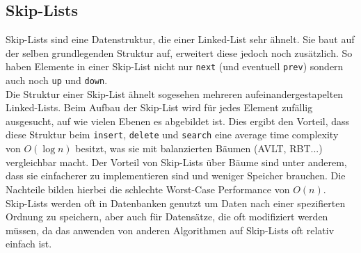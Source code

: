 \documentclass[
../../AuD-Zusammenfassung.tex,
]
{subfiles}
\begin{document}
\subsection{Skip-Lists}
Skip-Lists sind eine Datenstruktur, die einer Linked-List sehr ähnelt. Sie baut auf der selben grundlegenden Struktur auf, erweitert diese jedoch noch zusätzlich. So haben Elemente in einer Skip-List nicht nur \texttt{next} (und eventuell \texttt{prev}) sondern auch noch \texttt{up} und \texttt{down}. \\
Die Struktur einer Skip-List ähnelt sogesehen mehreren aufeinandergestapelten Linked-Lists. Beim Aufbau der Skip-List wird für jedes Element zufällig ausgesucht, auf wie vielen Ebenen es abgebildet ist. Dies ergibt den Vorteil, dass diese Struktur beim \texttt{insert}, \texttt{delete} und \texttt{search} eine average time complexity von $O(\log n)$ besitzt, was sie mit balanzierten Bäumen (AVLT, RBT...) vergleichbar macht. Der Vorteil von Skip-Lists über Bäume sind unter anderem, dass sie einfacherer zu implementieren sind und weniger Speicher brauchen. Die Nachteile bilden hierbei die schlechte Worst-Case Performance von $O(n)$.\\
Skip-Lists werden oft in Datenbanken genutzt um Daten nach einer spezifierten Ordnung zu speichern, aber auch für Datensätze, die oft modifiziert werden müssen, da das anwenden von anderen Algorithmen auf Skip-Lists oft relativ einfach ist.\\

\end{document}
